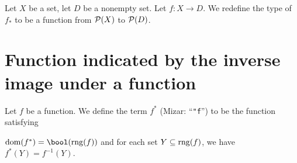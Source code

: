 \documentclass{article}
\begin{document}
\begin{definition}
Let $X$ be a set, let $D$ be a nonempty set.
Let $f\colon X\to D$.
We redefine the type of $f_{*}$ to be a function from $\mathcal{P}(X)$ to
$\mathcal{P}(D)$. 
\end{definition}

\section{Function indicated by the inverse image under a function}

\begin{definition}
Let $f$ be a function.
We define the term $f^{*}$ (Mizar: ``\verb#"f#'') to be the function satisfying
\begin{defn}
\item $\dom(f^{*})=\bool(\rng(f))$ and for each set $Y\subseteq\operatorname{rng}(f)$,
  we have $f^{*}(Y)=f^{-1}(Y)$.
\end{defn}
\end{definition}
\end{document}
